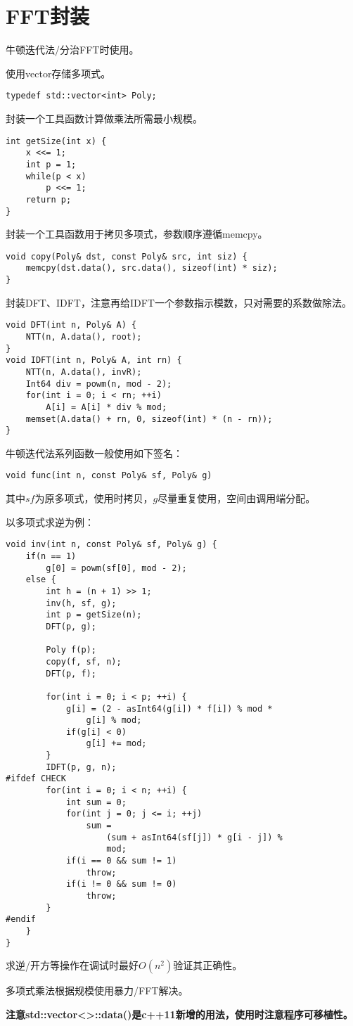 \section{FFT封装}
牛顿迭代法/分治FFT时使用。

使用vector存储多项式。
\begin{lstlisting}
typedef std::vector<int> Poly;
\end{lstlisting}

封装一个工具函数计算做乘法所需最小规模。
\begin{lstlisting}
int getSize(int x) {
    x <<= 1;
    int p = 1;
    while(p < x)
        p <<= 1;
    return p;
}
\end{lstlisting}

封装一个工具函数用于拷贝多项式，参数顺序遵循memcpy。
\begin{lstlisting}
void copy(Poly& dst, const Poly& src, int siz) {
    memcpy(dst.data(), src.data(), sizeof(int) * siz);
}
\end{lstlisting}

封装DFT、IDFT，注意再给IDFT一个参数指示模数，只对需要的系数做除法。
\begin{lstlisting}
void DFT(int n, Poly& A) {
    NTT(n, A.data(), root);
}
void IDFT(int n, Poly& A, int rn) {
    NTT(n, A.data(), invR);
    Int64 div = powm(n, mod - 2);
    for(int i = 0; i < rn; ++i)
        A[i] = A[i] * div % mod;
    memset(A.data() + rn, 0, sizeof(int) * (n - rn));
}
\end{lstlisting}

牛顿迭代法系列函数一般使用如下签名：
\begin{lstlisting}
void func(int n, const Poly& sf, Poly& g)
\end{lstlisting}

其中$sf$为原多项式，使用时拷贝，$g$尽量重复使用，空间由调用端分配。

以多项式求逆为例：
\begin{lstlisting}
void inv(int n, const Poly& sf, Poly& g) {
    if(n == 1)
        g[0] = powm(sf[0], mod - 2);
    else {
        int h = (n + 1) >> 1;
        inv(h, sf, g);
        int p = getSize(n);
        DFT(p, g);

        Poly f(p);
        copy(f, sf, n);
        DFT(p, f);

        for(int i = 0; i < p; ++i) {
            g[i] = (2 - asInt64(g[i]) * f[i]) % mod *
                g[i] % mod;
            if(g[i] < 0)
                g[i] += mod;
        }
        IDFT(p, g, n);
#ifdef CHECK
        for(int i = 0; i < n; ++i) {
            int sum = 0;
            for(int j = 0; j <= i; ++j)
                sum =
                    (sum + asInt64(sf[j]) * g[i - j]) %
                    mod;
            if(i == 0 && sum != 1)
                throw;
            if(i != 0 && sum != 0)
                throw;
        }
#endif
    }
}
\end{lstlisting}

求逆/开方等操作在调试时最好$O(n^2)$验证其正确性。

多项式乘法根据规模使用暴力/FFT解决。

{\bfseries 注意std::vector<>::data()是c++11新增的用法，使用时注意程序可移植性。}
